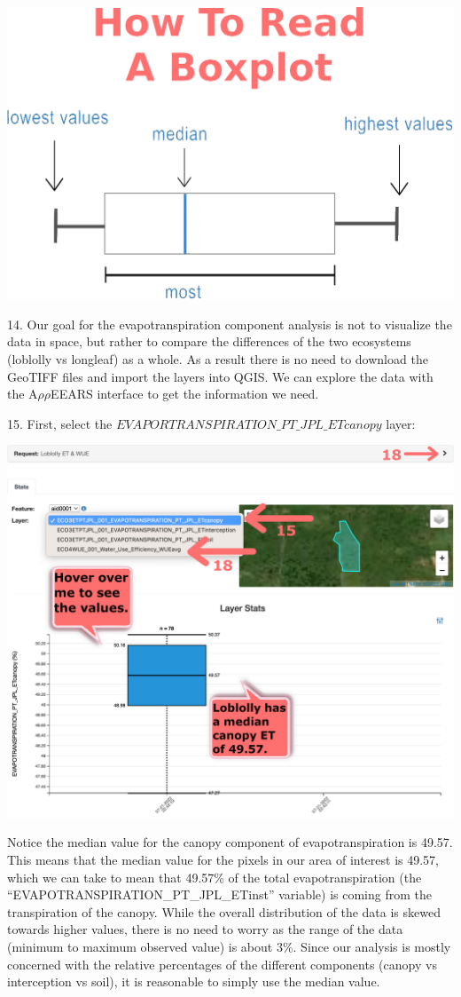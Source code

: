 \documentclass[oneside,a4paper,11pt,explicit]{book}
\begin{document}
\vspace{1em}

\centerline{\includegraphics[width=.45\textwidth]{HowToBoxplot.png}}

\vspace{.5em}

14. Our goal for the evapotranspiration component analysis is not to visualize the data in space, but rather to compare the differences of the two ecosystems (loblolly vs longleaf) as a whole. As a result there is no need to download the GeoTIFF files and import the layers into QGIS. We can explore the data with the A$\rho\rho$EEARS interface to get the information we need.

15. First, select the $EVAPORTRANSPIRATION\_PT\_JPL\_ETcanopy$ layer:

\vspace{.5em}

\centerline{\includegraphics[width=.6\textwidth]{ETComponents.png}}

\vspace{.5em}

Notice the median value for the canopy component of evapotranspiration is 49.57. This means that the median value for the pixels in our area of interest is 49.57, which we can take to mean that 49.57\% of the total evapotranspiration (the ``EVAPOTRANSPIRATION\_PT\_JPL\_ETinst'' variable) is coming from the transpiration of the canopy. While the overall distribution of the data is skewed towards higher values, there is no need to worry as the range of the data (minimum to maximum observed value) is about 3\%. Since our analysis is mostly concerned with the relative percentages of the different components (canopy vs interception vs soil), it is reasonable to simply use the median value.
\end{document}
